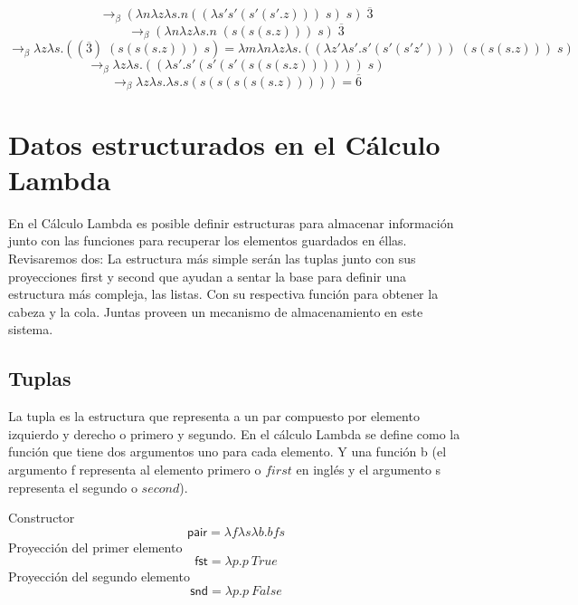 \begin{exercise}
\[            \]
            \[
                    \rightarrow_\beta (\lambda n\lambda z\lambda s.n((\lambda s's'(s'(s'.z))) \; s) \; s )  \; \overline{3}
            \]
            \[
                    \rightarrow_\beta (\lambda n\lambda z\lambda s.n \; (s(s(s.z))) \; s )  \; \overline{3}
            \]
            \[
                    \rightarrow_\beta \lambda z\lambda s.((\overline{3}) \; (s(s(s.z))) \; s) = \lambda m\lambda n\lambda z\lambda s.(( \lambda z'\lambda s'.s'(s'(s'z'))) \; (s(s(s.z))) \; s)
            \]
            \[
                    \rightarrow_\beta \lambda z\lambda s.((\lambda s'.s'(s'(s'(s(s(s.z))))))  \; s)
            \]
            \[
                    \rightarrow_\beta \lambda z\lambda s.\lambda s.s(s(s(s(s(s.z))))) = \overline{6}
            \]
        \end{exercise}

        \section{Datos estructurados en el Cálculo Lambda}

            En el Cálculo Lambda es posible definir estructuras para almacenar información junto con las funciones para recuperar los elementos guardados en éllas.
            Revisaremos dos: La estructura más simple serán las tuplas junto con sus proyecciones first y second que ayudan a sentar la base para definir una estructura más compleja, las listas. Con su respectiva función para obtener la cabeza y la cola. Juntas proveen un mecanismo de almacenamiento en este sistema.
    
            \subsection{Tuplas}

                La tupla es la estructura que representa a un par compuesto por elemento izquierdo y derecho o primero y segundo. En el cálculo Lambda se define como la función que tiene dos argumentos uno para cada elemento. Y una función b (el argumento f representa al elemento primero o $first$ en inglés y el argumento s representa el segundo o $second$).
        
                \begin{definition}
            
                    Constructor
                        $$\mathsf{pair} = \lambda f\lambda s\lambda b. bfs$$
                    Proyección del primer elemento
                        $$\mathsf{fst} = \lambda p.p \ True$$
                    Proyección del segundo elemento
                        $$\mathsf{snd} = \lambda p.p \ False$$
                \end{definition}

